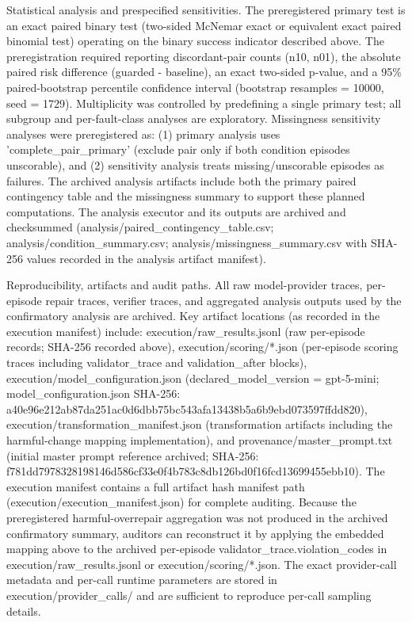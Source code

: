 \documentclass[conference]{IEEEtran}
\begin{document}
Statistical analysis and prespecified sensitivities. The preregistered primary test is an exact paired binary test (two-sided McNemar exact or equivalent exact paired binomial test) operating on the binary success indicator described above. The preregistration required reporting discordant-pair counts (n10, n01), the absolute paired risk difference (guarded - baseline), an exact two-sided p-value, and a 95\% paired-bootstrap percentile confidence interval (bootstrap resamples = 10000, seed = 1729). Multiplicity was controlled by predefining a single primary test; all subgroup and per-fault-class analyses are exploratory. Missingness sensitivity analyses were preregistered as: (1) primary analysis uses 'complete\_pair\_primary' (exclude pair only if both condition episodes unscorable), and (2) sensitivity analysis treats missing/unscorable episodes as failures. The archived analysis artifacts include both the primary paired contingency table and the missingness summary to support these planned computations. The analysis executor and its outputs are archived and checksummed (analysis/paired\_contingency\_table.csv; analysis/condition\_summary.csv; analysis/missingness\_summary.csv with SHA-256 values recorded in the analysis artifact manifest).

Reproducibility, artifacts and audit paths. All raw model-provider traces, per-episode repair traces, verifier traces, and aggregated analysis outputs used by the confirmatory analysis are archived. Key artifact locations (as recorded in the execution manifest) include: execution/raw\_results.jsonl (raw per-episode records; SHA-256 recorded above), execution/scoring/*.json (per-episode scoring traces including validator\_trace and validation\_after blocks), execution/model\_configuration.json (declared\_model\_version = gpt-5-mini; model\_configuration.json SHA-256: a40e96e2\allowbreak{}12ab87da\allowbreak{}251ac0d6\allowbreak{}dbb75bc5\allowbreak{}43afa134\allowbreak{}38b5a6b9\allowbreak{}ebd07359\allowbreak{}7ffdd820), execution/transformation\_manifest.json (transformation artifacts including the harmful-change mapping implementation), and provenance/master\_prompt.txt (initial master prompt reference archived; SHA-256: f781dd79\allowbreak{}78328198\allowbreak{}146d586c\allowbreak{}f33e0f4b\allowbreak{}783c8db1\allowbreak{}26bd0f16\allowbreak{}fcd13699\allowbreak{}455ebb10). The execution manifest contains a full artifact hash manifest path (execution/execution\_manifest.json) for complete auditing. Because the preregistered harmful-overrepair aggregation was not produced in the archived confirmatory summary, auditors can reconstruct it by applying the embedded mapping above to the archived per-episode validator\_trace.violation\_codes in execution/raw\_results.jsonl or execution/scoring/*.json. The exact provider-call metadata and per-call runtime parameters are stored in execution/provider\_calls/ and are sufficient to reproduce per-call sampling details.
\end{document}
